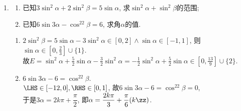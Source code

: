 \begin{enumerate}
\begin{jieda}
\begin{enumerate}[(1)]
\item $\iff\tan^2\alpha\sin^2\alpha=\tan^2\alpha-\sin^2\alpha\iff\sin^2\alpha=\tan^2\alpha-\tan^2\alpha\sin^2\alpha$. 

\item 通分, 配凑. 
\begin{align*}
\LHS & = \dfrac{\cos\alpha(1+\cos\alpha)-\sin\alpha(1+\sin\alpha)}{(1+\sin\alpha)(1+\cos\alpha)}\\
& = \dfrac{(\cos\alpha-\sin\alpha)(1+\cos\alpha+\sin\alpha)}{(1+\sin\alpha)(1+\cos\alpha)}\\
& = \dfrac{2(\cos\alpha-\sin\alpha)}{1+\sin\alpha+\cos\alpha}\cdot\dfrac{(1+\cos\alpha+\sin\alpha)^2}{2(1+\sin\alpha)(1+\cos\alpha)}\\
& = \RHS\cdot\dfrac{1+\cos^2\alpha+\sin^2\alpha+2\cos\alpha+2\sin\alpha+2\cos\alpha\sin\alpha}{2(1+\cos\alpha+\sin\alpha+\cos\alpha\sin\alpha)}\\
& = \RHS
\end{align*}
\end{enumerate}
\end{jieda}


\item
\begin{enumerate}
\item 已知$3\sin^2\alpha+2\sin^2\beta=5\sin\alpha$, 求$\sin^2\alpha+\sin^2\beta$的范围; 
\item 已知$6\sin3\alpha-\cos^22\beta=6$, 求角$\alpha$的值. 
\end{enumerate}
\begin{jieda}
\begin{enumerate}
\item $2\sin^2\beta=5\sin\alpha-3\sin^2\alpha\in[0,2]\land\sin\alpha\in[-1,1]$, 则$\sin\alpha\in[0,\frac{2}{3}]\cup\{1\}$. \\
故$E=\sin^2\alpha+\frac{5}{2}\sin\alpha-\frac{3}{2}\sin^2\alpha=-\frac{1}{2}\sin^2\alpha+\frac{5}{2}\sin\alpha\in[0,\frac{13}{9}]\cup\{2\}$. 

\item $6\sin3\alpha-6=\cos^22\beta$. \\
$\LHS\in[-12,0],\RHS\in[0,1]$, 故$6\sin3\alpha-6=\cos^22\beta=0$, \\
于是$3\alpha=2k\pi+\dfrac{\pi}{2}$, 即$\alpha=\dfrac{2k\pi}{3}+\dfrac{\pi}{6}(k\zz)$. 
\end{enumerate}
\end{jieda}
\end{enumerate}





